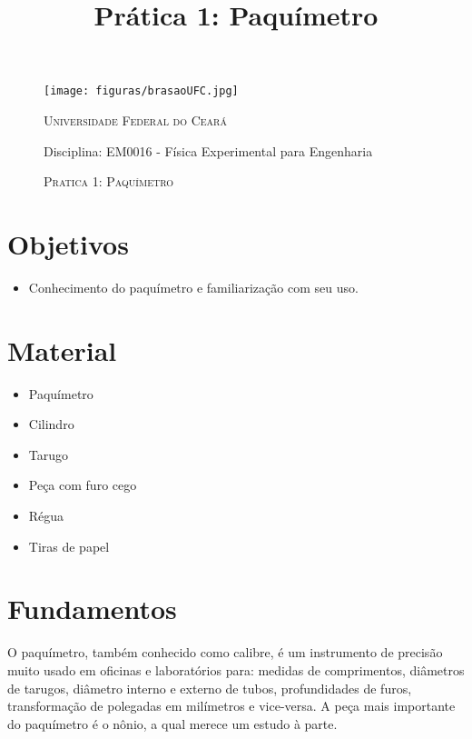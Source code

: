 \documentclass[10pt,a4paper,onecolumn,notitlepage]{scrartcl}
\author{}
\title{Prática 1: Paquímetro}
\begin{document}
\thispagestyle{myheadings}

\begin{figure}
\begin{minipage}{0.08\linewidth}
\texttt{[image: figuras/brasaoUFC.jpg]} 
\end{minipage}
\begin{minipage}{0.91\linewidth}
\textsc{Universidade Federal do Ceará}

Disciplina: EM0016 - Física Experimental para Engenharia
\end{minipage}

\begin{minipage}{\linewidth}
\centering
\textsc{Pratica 1: Paquímetro}
\\
\hrulefill %
\end{minipage}
\end{figure}

\section{Objetivos}

\begin{itemize}
\item Conhecimento do paquímetro e familiarização com seu uso.
\end{itemize}

\section{Material}

\begin{multicols}{3}
\begin{itemize}
\item Paquímetro
\item Cilindro
\item Tarugo
\item Peça com furo cego
\item Régua
\item Tiras de papel
\end{itemize}
\end{multicols}

\section{Fundamentos}
O paquímetro, também conhecido como calibre, é um instrumento de precisão muito usado em oficinas e laboratórios para: medidas de comprimentos, diâmetros de tarugos, diâmetro interno e externo de tubos, profundidades de furos, transformação de polegadas em milímetros e vice-versa. A peça mais importante do paquímetro é o nônio, a qual merece um estudo à parte.
\end{document}
